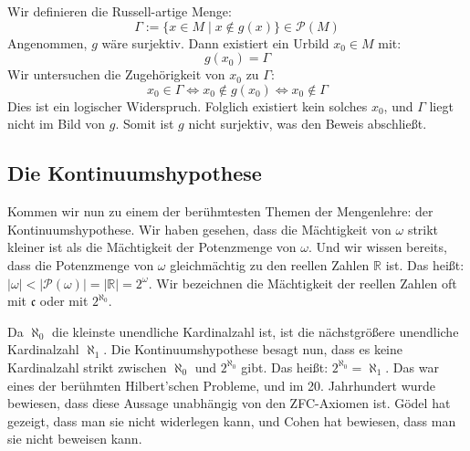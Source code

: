 \begin{math-stroke}
Wir definieren die Russell-artige Menge:
\[
\Gamma := \{ x \in M \mid x \notin g(x) \} \in \mathcal{P}(M)
\]
Angenommen, $g$ wäre surjektiv. Dann existiert ein Urbild $x_0 \in M$ mit:
\[
g(x_0) = \Gamma
\]
Wir untersuchen die Zugehörigkeit von $x_0$ zu $\Gamma$:
\[
x_0 \in \Gamma \iff x_0 \notin g(x_0) \iff x_0 \notin \Gamma
\]
Dies ist ein logischer Widerspruch. Folglich existiert kein solches $x_0$, und $\Gamma$ liegt nicht im Bild von $g$. Somit ist $g$ nicht surjektiv, was den Beweis abschließt.
\end{math-stroke}

\subsection{Die Kontinuumshypothese}

\begin{spoken-clean}[01:03:23 - 01:05:20]
Kommen wir nun zu einem der berühmtesten Themen der Mengenlehre: der Kontinuumshypothese. Wir haben gesehen, dass die Mächtigkeit von $\omega$ strikt kleiner ist als die Mächtigkeit der Potenzmenge von $\omega$. Und wir wissen bereits, dass die Potenzmenge von $\omega$ gleichmächtig zu den reellen Zahlen $\mathbb{R}$ ist. Das heißt: $|\omega| < |\mathcal{P}(\omega)| = |\mathbb{R}| = 2^\omega$. Wir bezeichnen die Mächtigkeit der reellen Zahlen oft mit $\mathfrak{c}$ oder mit $2^{\aleph_0}$.
\end{spoken-clean}

\begin{spoken-clean}[01:05:20 - 01:07:21]
Da $\aleph_0$ die kleinste unendliche Kardinalzahl ist, ist die nächstgrößere unendliche Kardinalzahl $\aleph_1$. Die Kontinuumshypothese besagt nun, dass es keine Kardinalzahl strikt zwischen $\aleph_0$ und $2^{\aleph_0}$ gibt. Das heißt: $2^{\aleph_0} = \aleph_1$. Das war eines der berühmten Hilbert'schen Probleme, und im 20. Jahrhundert wurde bewiesen, dass diese Aussage unabhängig von den ZFC-Axiomen ist. Gödel hat gezeigt, dass man sie nicht widerlegen kann, und Cohen hat bewiesen, dass man sie nicht beweisen kann.
\end{spoken-clean}

